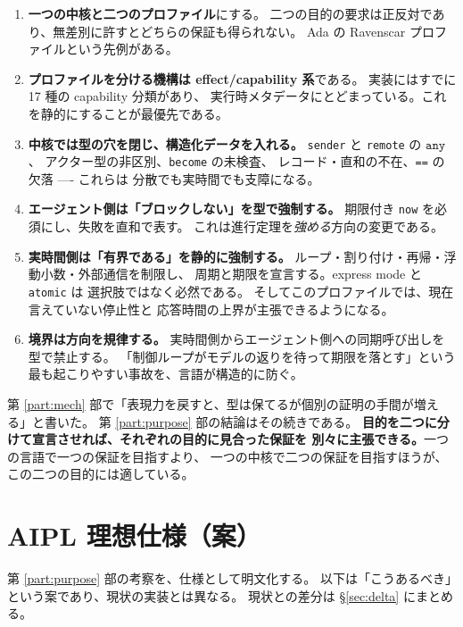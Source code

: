 \documentclass[11pt,a4paper]{ltjsarticle}
\theoremstyle{remark}
\newcommand{\ty}[1]{\ensuremath{\mathtt{#1}}}
\begin{document}
\begin{enumerate}
\item \textbf{一つの中核と二つのプロファイル}にする。
  二つの目的の要求は正反対であり、無差別に許すとどちらの保証も得られない。
  Ada の Ravenscar プロファイルという先例がある。

\item \textbf{プロファイルを分ける機構は effect/capability 系}である。
  実装にはすでに 17 種の capability 分類があり、
  実行時メタデータにとどまっている。これを静的にすることが最優先である。

\item \textbf{中核では型の穴を閉じ、構造化データを入れる。}
  \texttt{sender} と \texttt{remote} の \ty{any}、
  アクター型の非区別、\texttt{become} の未検査、
  レコード・直和の不在、\texttt{==} の欠落 ---- これらは
  分散でも実時間でも支障になる。

\item \textbf{エージェント側は「ブロックしない」を型で強制する。}
  期限付き \texttt{now} を必須にし、失敗を直和で表す。
  これは進行定理を\emph{強める}方向の変更である。

\item \textbf{実時間側は「有界である」を静的に強制する。}
  ループ・割り付け・再帰・浮動小数・外部通信を制限し、
  周期と期限を宣言する。express mode と \texttt{atomic} は
  選択肢ではなく必然である。
  そしてこのプロファイルでは、現在言えていない停止性と
  応答時間の上界が主張できるようになる。

\item \textbf{境界は方向を規律する。}
  実時間側からエージェント側への同期呼び出しを型で禁止する。
  「制御ループがモデルの返りを待って期限を落とす」という
  最も起こりやすい事故を、言語が構造的に防ぐ。
\end{enumerate}

第 \ref{part:mech} 部で「表現力を戻すと、型は保てるが個別の証明の手間が増える」と書いた。
第 \ref{part:purpose} 部の結論はその続きである。
\textbf{目的を二つに分けて宣言させれば、それぞれの目的に見合った保証を
別々に主張できる。}一つの言語で一つの保証を目指すより、
一つの中核で二つの保証を目指すほうが、この二つの目的には適している。


\part{AIPL 理想仕様（案）}
\label{part:spec}

第 \ref{part:purpose} 部の考察を、仕様として明文化する。
以下は「こうあるべき」という案であり、現状の実装とは異なる。
現状との差分は \S\ref{sec:delta} にまとめる。
\end{document}
